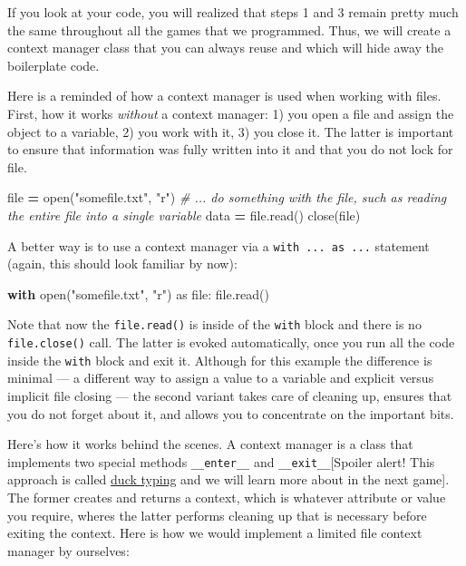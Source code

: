 \documentclass[
]{book}
\newenvironment{Shaded}{\begin{snugshade}}{\end{snugshade}}
\newcommand{\BuiltInTok}[1]{#1}
\newcommand{\CommentTok}[1]{\textcolor[rgb]{0.56,0.35,0.01}{\textit{#1}}}
\newcommand{\ControlFlowTok}[1]{\textcolor[rgb]{0.13,0.29,0.53}{\textbf{#1}}}
\newcommand{\ImportTok}[1]{#1}
\newcommand{\NormalTok}[1]{#1}
\newcommand{\OperatorTok}[1]{\textcolor[rgb]{0.81,0.36,0.00}{\textbf{#1}}}
\newcommand{\StringTok}[1]{\textcolor[rgb]{0.31,0.60,0.02}{#1}}
\begin{document}
If you look at your code, you will realized that steps 1 and 3 remain pretty much the same throughout all the games that we programmed. Thus, we will create a context manager class that you can always reuse and which will hide away the boilerplate code.

Here is a reminded of how a context manager is used when working with files. First, how it works \emph{without} a context manager: 1) you open a file and assign the object to a variable, 2) you work with it, 3) you close it. The latter is important to ensure that information was fully written into it and that you do not lock for file.

\begin{Shaded}
\begin{Highlighting}[]
\BuiltInTok{file} \OperatorTok{=} \BuiltInTok{open}\NormalTok{(}\StringTok{"somefile.txt"}\NormalTok{, }\StringTok{"r"}\NormalTok{)}
\CommentTok{\# ... do something with the file, such as reading the entire file into a single variable}
\NormalTok{data }\OperatorTok{=} \BuiltInTok{file}\NormalTok{.read()}
\NormalTok{close(}\BuiltInTok{file}\NormalTok{)}
\end{Highlighting}
\end{Shaded}

A better way is to use a context manager via a \texttt{with\ ...\ as\ ...} statement (again, this should look familiar by now):

\begin{Shaded}
\begin{Highlighting}[]
\ControlFlowTok{with} \BuiltInTok{open}\NormalTok{(}\StringTok{"somefile.txt"}\NormalTok{, }\StringTok{"r"}\NormalTok{) }\ImportTok{as} \BuiltInTok{file}\NormalTok{:}
    \BuiltInTok{file}\NormalTok{.read()}
\end{Highlighting}
\end{Shaded}

Note that now the \texttt{file.read()} is inside of the \texttt{with} block and there is no \texttt{file.close()} call. The latter is evoked automatically, once you run all the code inside the \texttt{with} block and exit it. Although for this example the difference is minimal --- a different way to assign a value to a variable and explicit versus implicit file closing --- the second variant takes care of cleaning up, ensures that you do not forget about it, and allows you to concentrate on the important bits.

Here's how it works behind the scenes. A context manager is a class that implements two special methods \texttt{\_\_enter\_\_} and \texttt{\_\_exit\_\_}{[}Spoiler alert! This approach is called \href{duck-typing}{duck typing} and we will learn more about in the next game{]}. The former creates and returns a context, which is whatever attribute or value you require, wheres the latter performs cleaning up that is necessary before exiting the context. Here is how we would implement a limited file context manager by ourselves:
\end{document}
